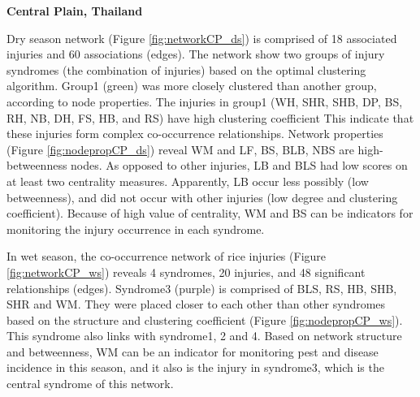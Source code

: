 
\textbf{Central Plain, Thailand}

Dry season network (Figure \ref{fig:networkCP_ds}) is comprised of 18 associated injuries and  60 associations (edges). The network show two groups of injury syndromes (the combination of injuries) based on the optimal clustering algorithm. Group1 (green) was more closely clustered than another group, according to node properties. The injuries in group1 (WH, SHR, SHB, DP, BS, RH, NB, DH, FS, HB, and RS) have high clustering coefficient This indicate that these injuries form complex co-occurrence relationships. Network properties (Figure \ref{fig:nodepropCP_ds}) reveal WM and LF, BS, BLB, NBS are high-betweenness nodes. As opposed to other injuries, LB and BLS had low scores on at least two centrality measures. Apparently, LB occur less possibly (low betweenness), and did not occur with other injuries (low degree and clustering coefficient). Because of high value of centrality, WM and BS can be indicators for monitoring the injury occurrence in each syndrome.

In wet season, the co-occurrence network of rice injuries (Figure \ref{fig:networkCP_ws}) reveals 4 syndromes, 20 injuries, and 48 significant relationships (edges). Syndrome3 (purple) is comprised of BLS, RS, HB, SHB, SHR and WM. They were placed closer to each other than other syndromes based on the structure and clustering coefficient (Figure \ref{fig:nodepropCP_ws}). This syndrome also links with syndrome1, 2 and 4. Based on network structure and betweenness, WM can be an indicator for monitoring pest and disease incidence in this season, and it also is the injury in syndrome3, which is the central syndrome of this network. 

